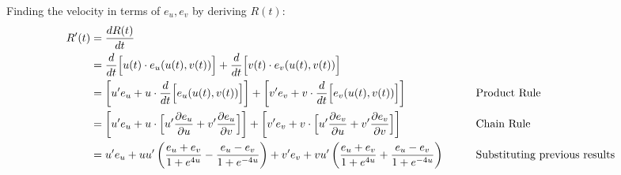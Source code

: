 \documentclass[a4paper, 11pt]{article}
\begin{document}
\begin{enumerate}[label=(\alph*)]
        Finding the velocity in terms of $e_u,e_v$ by deriving $R(t)$:
        \begin{alignat*}{2}
          R'(t)   & = \dfrac{dR(t)}{dt}                                                                                                                                                                                                 \\
                  & = \dfrac{d}{dt}\Big[u(t)\cdot e_u(u(t),v(t))  \Big] + \dfrac{d}{dt}\Big[ v(t)\cdot e_v(u(t),v(t)) \Big]                                                                                                                    \\
                  & = \left[ u'e_u  +u\cdot\dfrac{d}{dt}\Big[e_u(u(t),v(t))\Big] \right] + \left[   v'e_v +v\cdot\dfrac{d}{dt}\Big[e_v(u(t),v(t))\Big]\right]                     &                                      & \text{Product Rule} \\
                  & = \left[ u'e_u  +u\cdot\Big[u'\dfrac{\partial e_u}{\partial u} + v'\dfrac{\partial e_u}{\partial v}\Big] \right] + \left[   v'e_v +v\cdot\Big[u'\dfrac{\partial e_v}{\partial u} + v'\dfrac{\partial e_v}{\partial v}\Big]\right] &                                      & \text{Chain Rule}   \\
                  & =  u'e_u  +uu'\left(
          \frac{e_u+e_v}{1+e^{4u}}
          -\frac{e_u-e_v}{1+e^{-4u}}
          \right)
          +    v'e_v +vu'\left(
          \frac{e_u+e_v}{1+e^{4u}}
          +\frac{e_u-e_v}{1+e^{-4u}}
          \right) & \qquad                                                                                                                                          & \text{Substituting previous results}
        \end{alignat*}


\end{enumerate}
\end{document}
